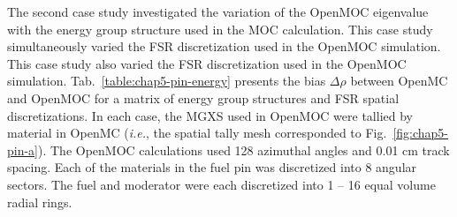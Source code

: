 The second case study investigated the variation of the OpenMOC eigenvalue with the energy group structure used in the \ac{MOC} calculation. This case study simultaneously varied the \ac{FSR} discretization used in the OpenMOC simulation. This case study also varied the \ac{FSR} discretization used in the OpenMOC simulation. Tab.~\ref{table:chap5-pin-energy} presents the bias $\Delta\rho$ between OpenMC and OpenMOC for a matrix of energy group structures and \ac{FSR} spatial discretizations. In each case, the \ac{MGXS} used in OpenMOC were tallied by material in OpenMC (\textit{i.e.}, the spatial tally mesh corresponded to Fig.~\ref{fig:chap5-pin-a}). The OpenMOC calculations used 128 azimuthal angles and 0.01 cm track spacing. Each of the materials in the fuel pin was discretized into 8 angular sectors. The fuel and moderator were each discretized into 1 -- 16 equal volume radial rings. 

